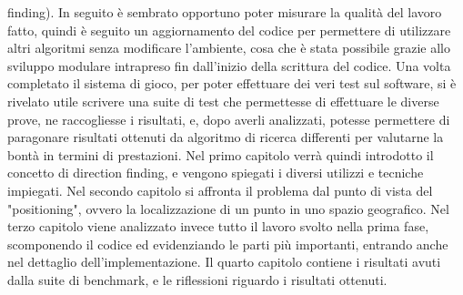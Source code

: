 finding). In seguito è sembrato opportuno poter misurare la qualità del lavoro fatto, quindi è seguito un aggiornamento del codice per permettere di utilizzare altri algoritmi senza modificare l'ambiente, cosa che è stata possibile grazie allo sviluppo modulare intrapreso fin dall'inizio della scrittura del codice. Una volta completato il sistema di gioco, per poter effettuare dei veri test sul software, si è rivelato utile scrivere una suite di test che permettesse di effettuare le diverse prove, ne raccogliesse i risultati, e, dopo averli analizzati, potesse permettere di paragonare risultati ottenuti da algoritmo di ricerca differenti per valutarne la bontà in termini di prestazioni.
Nel primo capitolo verrà quindi introdotto il concetto di direction finding, e vengono spiegati i diversi utilizzi e tecniche impiegati. Nel secondo capitolo si affronta il problema dal punto di vista del "positioning", ovvero la localizzazione di un punto in uno spazio geografico. Nel terzo capitolo viene analizzato invece tutto il lavoro svolto nella prima fase, scomponendo il codice ed evidenziando le parti più importanti, entrando anche nel dettaglio dell'implementazione. Il quarto capitolo contiene i risultati avuti dalla suite di benchmark, e le riflessioni riguardo i risultati ottenuti.